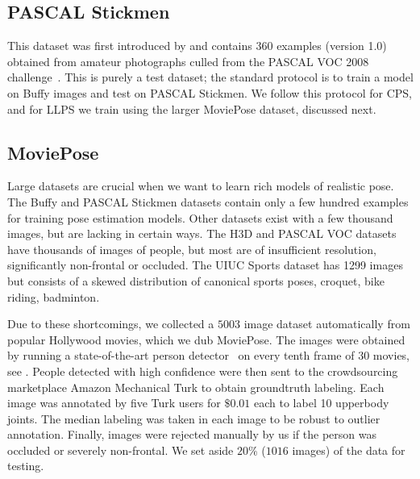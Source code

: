 \subsection{PASCAL Stickmen}  This dataset was first introduced by 
\citet{eichner09} and contains 360 examples (version 1.0) obtained from amateur 
photographs culled from the PASCAL VOC 2008 challenge~\citep{voc09}.  This is 
purely a test dataset; the standard protocol is to train a model on Buffy 
images and test on PASCAL Stickmen. We follow this protocol for CPS, and for 
LLPS we train using the larger MoviePose dataset, discussed next.

\subsection{MoviePose}
Large datasets are crucial when we want to learn rich models of realistic pose.
The Buffy and PASCAL Stickmen datasets contain only a few hundred examples for 
training pose estimation models.  Other datasets exist with a few thousand 
images, but are lacking in certain ways. The H3D \citep{poselets} and PASCAL 
VOC \citep{voc09} datasets have thousands of images of people, but most are of 
insufficient resolution, significantly non-frontal or occluded.  The UIUC 
Sports dataset \citep{wang2011} has 1299 images but consists of a skewed 
distribution of canonical sports poses, \eg croquet, bike riding, badminton.  

Due to these shortcomings, we collected a $5003$ image dataset automatically 
from popular Hollywood movies, which we dub MoviePose.  The images were 
obtained by running a state-of-the-art person detector~\citep{poselets} on 
every tenth frame of $30$ movies, see .  People detected with 
high confidence were then sent to the crowdsourcing marketplace Amazon 
Mechanical Turk to obtain groundtruth labeling.  Each image was annotated by 
five Turk users for $\$0.01$ each to label 10 upperbody joints.  The median 
labeling was taken in each image to be robust to outlier annotation.  Finally, 
images were rejected manually by us if the person was occluded or severely 
non-frontal.  We set aside $20\%$ ($1016$ images) of the data for testing.

